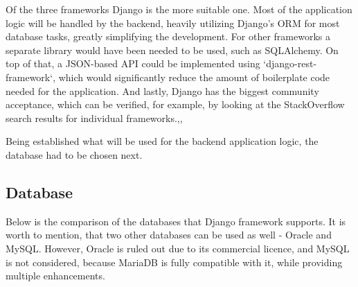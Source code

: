 Of the three frameworks Django is the more suitable one.
Most of the application logic will be handled by the backend, heavily utilizing
Django's ORM for most database tasks, greatly simplifying the development. For other frameworks a separate library would
have been needed to be used, such as SQLAlchemy\cite{sqlalchemy}.
On top of that, a JSON-based API could be implemented using `django-rest-framework`,
which would significantly reduce the amount of boilerplate code needed for the application.
And lastly, Django has the biggest community acceptance, which can be verified, for example, by looking at the
StackOverflow\cite{stackoverflow} search results for individual frameworks.\cite{so_fastapi},\cite{so_django},\cite{so_flask}

Being established what will be used for the backend application logic, the database had to be chosen next.

\subsection{Database}
Below is the comparison of the databases that Django framework supports.
It is worth to mention, that two other databases can be used as well - Oracle and MySQL.
However, Oracle is ruled out due to its commercial licence, and MySQL is not considered, because
MariaDB is fully compatible with it, while providing multiple enhancements.

